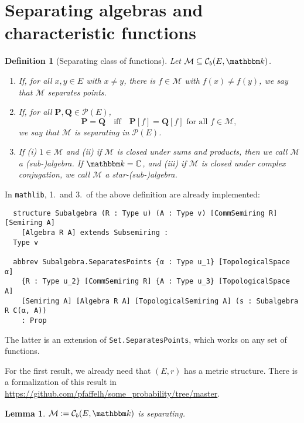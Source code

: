 \documentclass{article}
\newtheorem{lemma}[proposition]{Lemma}
\newtheorem{definition}[proposition]{Definition}
\theoremstyle{definition}
\theoremstyle{step} \newtheorem{step}{Step}
\newcommand{\leanline}[1]{\texttt{#1}}%
\begin{document}
\section{Separating algebras and characteristic functions}
 
\begin{definition}[Separating class of functions]
  \mbox{} Let $\mathcal M \subseteq \mathcal C_{b}(E,\mathbbm k)$.
  \begin{enumerate}
    \item If, for all $x,y\in E$ with $x\neq y$, there is
      $f\in\mathcal M$ with $f(x)\neq f(y)$, we say that $\mathcal M$
      separates points.
    \item 
      If, for all $\mathbf P, \mathbf Q\in\mathcal P(E)$,
      $$ \mathbf P = \mathbf Q \quad \text{iff}\quad \mathbf P[f] =
      \mathbf Q[f] \text{ for all } f\in\mathcal M,$$ we say that
      $\mathcal M$ is separating in $\mathcal P(E)$.
    \item If (i) $1\in\mathcal M$ and (ii) if $\mathcal M$ is closed
      under sums and products, then we call $\mathcal M$ a
      (sub-)algebra.  If $\mathbbm k = \mathbb C$, and (iii) if
      $\mathcal M$ is closed under complex conjugation, we call
      $\mathcal M$ a star-(sub-)algebra.
  \end{enumerate}
\end{definition}

In \leanline{mathlib}, 1.\ and 3.\ of the above definition are already
implemented:

\begin{verbatim}
  structure Subalgebra (R : Type u) (A : Type v) [CommSemiring R] [Semiring A]
    [Algebra R A] extends Subsemiring :
  Type v

  abbrev Subalgebra.SeparatesPoints {α : Type u_1} [TopologicalSpace α]
    {R : Type u_2} [CommSemiring R] {A : Type u_3} [TopologicalSpace A]
    [Semiring A] [Algebra R A] [TopologicalSemiring A] (s : Subalgebra R C(α, A))
    : Prop
\end{verbatim}

The latter is an extension of \leanline{Set.SeparatesPoints}, which
works on any set of functions.

\noindent
For the first result, we already need that $(E,r)$ has a metric
structure. There is a formalization of this result in
\url{https://github.com/pfaffelh/some_probability/tree/master}.

\begin{lemma}\label{l:unique}
  $\mathcal M := \mathcal C_b(E, \mathbbm k)$ is separating.
\end{lemma}
\end{document}
